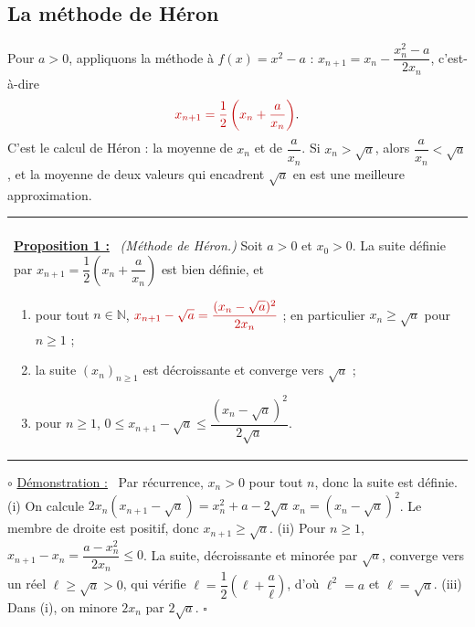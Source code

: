 \documentclass[a4paper,twoside]{report}
\makeatletter
\newcommand{\rmath}[1]{\textcolor{rougecours}{#1}}
\newenvironment{cadre}%
 {\par\vspace{2mm}\noindent\begin{tabular}{|@{\hspace{4mm}}p{0.93\textwidth}@{\hspace{4mm}}|}
  \hline \\[-2mm]}%
 {\\[2mm] \hline \end{tabular}\par\vspace{3mm}}
\newcommand{\propo}[1]{\textbf{\underline{Proposition #1 :}}~}
\newenvironment{demo}%
 {\par\needspace{4\baselineskip}\vspace{1mm}\noindent$\circ$ \underline{Démonstration :}~\setlength{\parskip}{3pt plus 1pt}}%
 {\hfill$\square$\par\vspace{2mm}}
\newcommand{\N}{\mathbb{N}}
\makeatother
\begin{document}
\subsection{La méthode de Héron}

Pour $a > 0$, appliquons la méthode à $f(x) = x^{2} - a$ : $x_{n + 1} = x_{n} - \dfrac{x_{n}^{2} - a}{2x_{n}}$, c'est-à-dire
\[ \rmath{x_{n + 1} = \frac{1}{2}\left(x_{n} + \frac{a}{x_{n}}\right)}. \]
C'est le calcul de Héron : la moyenne de $x_{n}$ et de $\dfrac{a}{x_{n}}$. Si $x_{n} > \sqrt{a}$, alors $\dfrac{a}{x_{n}} < \sqrt{a}$, et la moyenne de deux valeurs qui encadrent $\sqrt{a}$ en est une meilleure approximation.

\begin{cadre}
\propo{1} \emph{(Méthode de Héron.)} Soit $a > 0$ et $x_{0} > 0$. La suite définie par $x_{n + 1} = \dfrac{1}{2}\left(x_{n} + \dfrac{a}{x_{n}}\right)$ est bien définie, et
\begin{enumerate}[label=(\roman*),topsep=3pt,itemsep=2pt]
  \item pour tout $n \in \N$, $\rmath{x_{n + 1} - \sqrt{a} = \dfrac{(x_{n} - \sqrt{a})^{2}}{2x_{n}}}$ ; en particulier $x_{n} \geqslant \sqrt{a}$ pour $n \geqslant 1$ ;
  \item la suite $(x_{n})_{n \geqslant 1}$ est décroissante et converge vers $\sqrt{a}$ ;
  \item pour $n \geqslant 1$, $0 \leqslant x_{n + 1} - \sqrt{a} \leqslant \dfrac{(x_{n} - \sqrt{a})^{2}}{2\sqrt{a}}$.
\end{enumerate}
\end{cadre}

\begin{demo}
Par récurrence, $x_{n} > 0$ pour tout $n$, donc la suite est définie. (i) On calcule $2x_{n}(x_{n + 1} - \sqrt{a}) = x_{n}^{2} + a - 2\sqrt{a}\,x_{n} = (x_{n} - \sqrt{a})^{2}$. Le membre de droite est positif, donc $x_{n + 1} \geqslant \sqrt{a}$. (ii) Pour $n \geqslant 1$, $x_{n + 1} - x_{n} = \dfrac{a - x_{n}^{2}}{2x_{n}} \leqslant 0$. La suite, décroissante et minorée par $\sqrt{a}$, converge vers un réel $\ell \geqslant \sqrt{a} > 0$, qui vérifie $\ell = \dfrac{1}{2}\left(\ell + \dfrac{a}{\ell}\right)$, d'où $\ell^{2} = a$ et $\ell = \sqrt{a}$. (iii) Dans (i), on minore $2x_{n}$ par $2\sqrt{a}$.
\end{demo}
\end{document}
